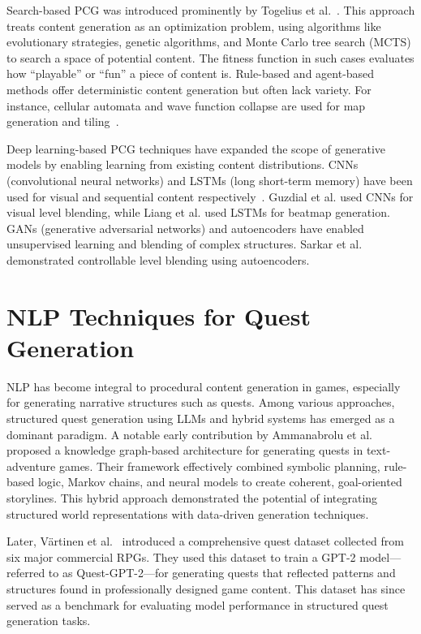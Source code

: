 Search-based PCG was introduced prominently by Togelius et al.~\cite{togelius2011search}. This approach
treats content generation as an optimization problem, using algorithms like evolutionary
strategies, genetic algorithms, and Monte Carlo tree search (MCTS) to search a space of
potential content. The fitness function in such cases evaluates how “playable” or “fun”
a piece of content is. Rule-based and agent-based methods offer deterministic content
generation but often lack variety. For instance, cellular automata and wave function
collapse are used for map generation and tiling~\cite{shaker2016procedural}.

Deep learning-based PCG techniques have expanded the scope of generative models
by enabling learning from existing content distributions. CNNs (convolutional neural
networks) and LSTMs (long short-term memory) have been used for visual and sequential
content respectively~\cite{liu2021deep}. Guzdial et al.\cite{guzdial2017visual} used CNNs for visual level blending, while
Liang et al.\cite{liang2019procedural} used LSTMs for beatmap generation. GANs (generative adversarial
networks) and autoencoders have enabled unsupervised learning and blending of complex
structures. Sarkar et al.~\cite{sarkar2020controllable} demonstrated controllable level blending using autoencoders.

\section{NLP Techniques for Quest Generation}

NLP has become integral to procedural content generation in games, especially for generating
narrative structures such as quests. Among various approaches, structured quest
generation using LLMs and hybrid systems has emerged as a dominant paradigm. A
notable early contribution by Ammanabrolu et al.~\cite{ammanabrolu2019toward} proposed a knowledge graph-based
architecture for generating quests in text-adventure games. Their framework effectively
combined symbolic planning, rule-based logic, Markov chains, and neural models to create
coherent, goal-oriented storylines. This hybrid approach demonstrated the potential of
integrating structured world representations with data-driven generation techniques.

Later, V{\"a}rtinen et al.~\cite{vartinen2022generating} introduced a comprehensive quest dataset collected from
six major commercial RPGs. They used this dataset to train a GPT-2 model—referred
to as Quest-GPT-2—for generating quests that reflected patterns and structures found in
professionally designed game content. This dataset has since served as a benchmark for
evaluating model performance in structured quest generation tasks.

